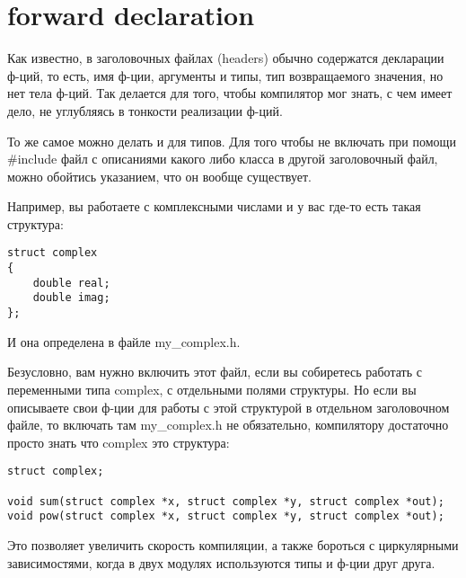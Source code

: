 ﻿\label{forwarddeclaration}
\section{forward declaration}

Как известно, в заголовочных файлах (headers) обычно содержатся декларации ф-ций, то есть, 
имя ф-ции, аргументы и типы, тип возвращаемого значения, но нет тела ф-ций. Так делается для того,
чтобы компилятор мог знать, с чем имеет дело, не углубляясь в тонкости реализации ф-ций.

То же самое можно делать и для типов. Для того чтобы не включать при помощи \#include файл с описаниями
какого либо класса в другой заголовочный файл, можно обойтись указанием, что он вообще существует.

Например, вы работаете с комплексными числами и у вас где-то есть такая структура:

\begin{lstlisting}
struct complex
{
	double real;
	double imag;
};
\end{lstlisting}

И она определена в файле my\_complex.h.

Безусловно, вам нужно включить этот файл, если вы собиретесь работать с переменными типа complex, 
с отдельными полями структуры.
Но если вы описываете свои ф-ции для работы с этой структурой в отдельном заголовочном файле, то включать там
my\_complex.h не обязательно, компилятору достаточно просто знать что complex это структура:

\begin{lstlisting}
struct complex;

void sum(struct complex *x, struct complex *y, struct complex *out);
void pow(struct complex *x, struct complex *y, struct complex *out);
\end{lstlisting}

Это позволяет увеличить скорость компиляции, а также бороться с циркулярными зависимостями, когда
в двух модулях используются типы и ф-ции друг друга.
